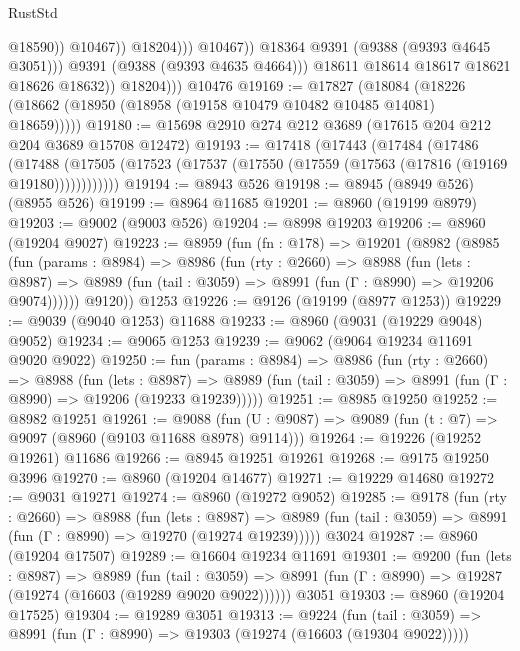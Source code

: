 \begin{lexlean}{RustStd}
\begin{coremodule}
                                    @18590))
                                @10467))
                            @18204)))
                      @10467))
                  @18364
                  @9391
                  (@9388 (@9393 @4645 @3051)))
                @9391
                (@9388 (@9393 @4635 @4664)))
              @18611
              @18614
              @18617
              @18621
              @18626
              @18632))
          @18204)))
    @10476
@19169 := @17827
    (@18084 (@18226 (@18662 (@18950 (@18958 (@19158 @10479 @10482 @10485 @14081) @18659)))))
@19180 := @15698 @2910 @274 @212 @3689 (@17615 @204 @212 @204 @3689 @15708 @12472)
@19193 := @17418
    (@17443
      (@17484
        (@17486
          (@17488 (@17505 (@17523 (@17537 (@17550 (@17559 (@17563 (@17816 (@19169 @19180))))))))))))
@19194 := @8943 @526
@19198 := @8945 (@8949 @526) (@8955 @526)
@19199 := @8964 @11685
@19201 := @8960 (@19199 @8979)
@19203 := @9002 (@9003 @526)
@19204 := @8998 @19203
@19206 := @8960 (@19204 @9027)
@19223 := @8959
    (fun (fn : @178) =>
    @19201
      (@8982
        (@8985
          (fun (params : @8984) =>
          @8986
            (fun (rty : @2660) =>
            @8988
              (fun (lets : @8987) =>
              @8989 (fun (tail : @3059) => @8991 (fun (Γ : @8990) => @19206 @9074))))))
        @9120))
    @1253
@19226 := @9126 (@19199 (@8977 @1253))
@19229 := @9039 (@9040 @1253) @11688
@19233 := @8960 (@9031 (@19229 @9048) @9052)
@19234 := @9065 @1253
@19239 := @9062 (@9064 @19234 @11691 @9020 @9022)
@19250 := fun (params : @8984) =>
  @8986
    (fun (rty : @2660) =>
    @8988
      (fun (lets : @8987) =>
      @8989 (fun (tail : @3059) => @8991 (fun (Γ : @8990) => @19206 (@19233 @19239)))))
@19251 := @8985 @19250
@19252 := @8982 @19251
@19261 := @9088
    (fun (U : @9087) => @9089 (fun (t : @7) => @9097 (@8960 (@9103 @11688 @8978) @9114)))
@19264 := @19226 (@19252 @19261) @11686
@19266 := @8945 @19251 @19261
@19268 := @9175 @19250 @3996
@19270 := @8960 (@19204 @14677)
@19271 := @19229 @14680
@19272 := @9031 @19271
@19274 := @8960 (@19272 @9052)
@19285 := @9178
    (fun (rty : @2660) =>
    @8988
      (fun (lets : @8987) =>
      @8989 (fun (tail : @3059) => @8991 (fun (Γ : @8990) => @19270 (@19274 @19239)))))
    @3024
@19287 := @8960 (@19204 @17507)
@19289 := @16604 @19234 @11691
@19301 := @9200
    (fun (lets : @8987) =>
    @8989
      (fun (tail : @3059) =>
      @8991 (fun (Γ : @8990) => @19287 (@19274 (@16603 (@19289 @9020 @9022))))))
    @3051
@19303 := @8960 (@19204 @17525)
@19304 := @19289 @3051
@19313 := @9224
    (fun (tail : @3059) => @8991 (fun (Γ : @8990) => @19303 (@19274 (@16603 (@19304 @9022)))))

\end{coremodule}
\end{lexlean}
